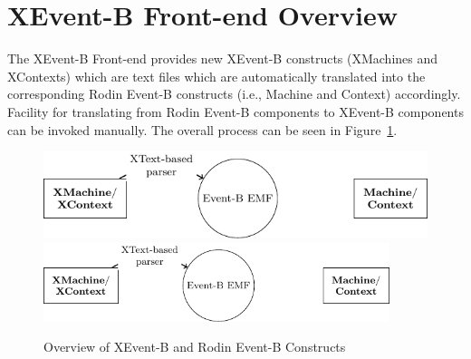 \section{XEvent-B Front-end Overview}
\label{sec:overview}

The XEvent-B  Front-end provides new XEvent-B constructs (XMachines and XContexts) which are text files which are automatically translated into the corresponding Rodin Event-B constructs (i.e., Machine and Context) accordingly.  Facility for translating from Rodin Event-B components to XEvent-B components can be invoked manually. The overall process can be seen in Figure~\ref{fig:overview}.
\begin{figure}[!htbp]
  \centering
  \ifplastex
  \includegraphics[width=512]{tikz-overview}
  \else
  \includegraphics[width=0.9\textwidth]{tikz-overview}
  \fi
  \caption{Overview of XEvent-B and Rodin Event-B Constructs}
  \label{fig:overview}
\end{figure}

